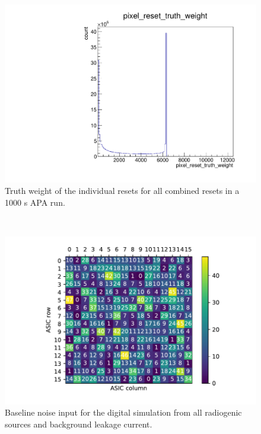 \begin{figure}[]
\centering
\includegraphics[width=\textwidth]{images/pixel_reset_truth_weight.pdf}
\caption{Truth weight of the individual resets for all combined resets in a 1000 s APA run.}
\end{figure}~\label{fig:pixel_truth_weight}


\begin{figure}[]
\centering
\includegraphics[width=\textwidth]{images/localHitsRadiogenic.pdf}
\caption{Baseline noise input for the digital simulation from all radiogenic sources and background leakage current.}
\end{figure}~\label{fig:reference_input_noise}

